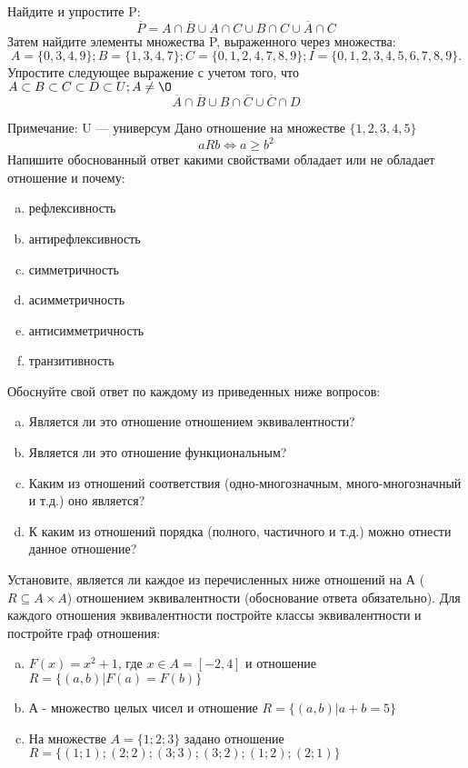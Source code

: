 \documentclass[10pt]{exam}
\begin{document}
\begin{questions}
\question
Найдите и упростите P:
\begin{equation*}
\overline{P} = A \cap \overline{B} \cup A \cap C \cup B \cap C \cup \overline{A} \cap C
\end{equation*}
Затем найдите элементы множества P, выраженного через множества:
\begin{equation*}
A = \{0, 3, 4, 9\}; 
B = \{1, 3, 4, 7\};
C = \{0, 1, 2, 4, 7, 8, 9\};
I = \{0, 1, 2, 3, 4, 5, 6, 7, 8, 9\}.
\end{equation*}\question
Упростите следующее выражение с учетом того, что $A\subset B \subset C \subset D \subset U; A \neq \O$
\begin{equation*}
\overline{A} \cap \overline{B} \cup B \cap \overline{C} \cup \overline{C} \cap D
\end{equation*}

Примечание: U — универсум\question
Дано отношение на множестве $\{1, 2, 3, 4, 5\}$ 
\begin{equation*}
aRb \iff a \geq b^2
\end{equation*}
Напишите обоснованный ответ какими свойствами обладает или не обладает отношение и почему:   
\begin{enumerate} [a)]\setcounter{enumi}{0}
\item рефлексивность
\item антирефлексивность
\item симметричность
\item асимметричность
\item антисимметричность
\item транзитивность
\end{enumerate}

Обоснуйте свой ответ по каждому из приведенных ниже вопросов:
\begin{enumerate} [a)]\setcounter{enumi}{0}
    \item Является ли это отношение отношением эквивалентности?
    \item Является ли это отношение функциональным?
    \item Каким из отношений соответствия (одно-многозначным, много-многозначный и т.д.) оно является?
    \item К каким из отношений порядка (полного, частичного и т.д.) можно отнести данное отношение?
\end{enumerate}


\question
Установите, является ли каждое из перечисленных ниже отношений на А ($R \subseteq A \times A$) отношением эквивалентности (обоснование ответа обязательно). Для каждого отношения эквивалентности постройте классы эквивалентности и постройте граф отношения:
\begin{enumerate} [a)]\setcounter{enumi}{0}
\item $F(x)=x^{2}+1$, где $x \in A = [-2, 4]$ и отношение $R = \{(a,b)|F(a) = F(b)\}$
\item А - множество целых чисел и отношение $R = \{(a,b)|a + b = 5\}$
\item На множестве $A = \{1; 2; 3\}$ задано отношение $R = \{(1; 1); (2; 2); (3; 3); (3; 2); (1; 2); (2; 1)\}$


\end{enumerate}
\end{questions}
\end{document}
